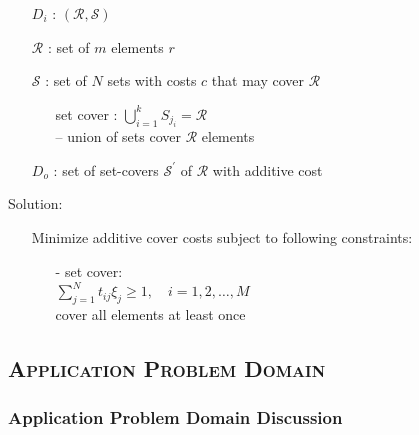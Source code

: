 \documentclass[conference]{IEEEtran}
\begin{document}
\begin{enumerate}
  \item[] $D_i$ : $(\mathcal{R,S})$
  \item[] $\mathcal{R}$ : set of $m$ elements $r$
  \item[] $\mathcal{S}$ : set of $N$ sets with costs $c$ that may cover
    $\mathcal{R}$
    \begin{enumerate}
      \item[] set cover : $\bigcup\limits_{i=1}^k S_{j_i} =
        \mathcal{R}$~\cite[Eq.~3.12]{christofides1975}\\ 
        -- union of sets cover $\mathcal{R}$
        elements
    \end{enumerate}
  \item[] $D_o$ : set of set-covers $\mathcal{S}^\prime$ of $\mathcal{R}$ with
    additive cost
\end{enumerate}

Solution:
\begin{enumerate}
  \item[] Minimize additive cover costs subject to following constraints:
    \begin{enumerate}
      \item[-] set cover:\\
        $\sum\limits_{j=1}^N t_{ij} \xi_j \geq 1, \quad i =
        1,2,\ldots,M$~\cite[Eq.  3.14]{christofides1975}\\
        cover all elements at least once
    \end{enumerate}
\end{enumerate}
\medskip




\subsection{\textsc{Application Problem Domain}} \label{sec:application}

\subsubsection{Application Problem Domain Discussion} \label{sec:APD}
\end{document}
